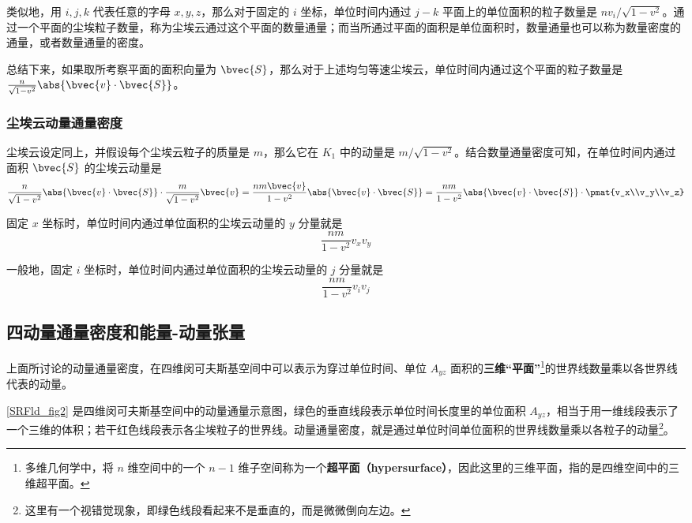 类似地，用 $i, j, k$ 代表任意的字母 $x, y, z$，那么对于固定的 $i$ 坐标，单位时间内通过 $j-k$ 平面上的单位面积的粒子数量是 $nv_i/\sqrt{1-v^2}$。通过一个平面的尘埃粒子数量，称为尘埃云通过这个平面的数量通量；而当所通过平面的面积是单位面积时，数量通量也可以称为数量密度的通量，或者数量通量的密度。

总结下来，如果取所考察平面的面积向量为 $\bvec{S}$，那么对于上述均匀等速尘埃云，单位时间内通过这个平面的粒子数量是 $\frac{n}{\sqrt{1-v^2}}\abs{\bvec{v}\cdot\bvec{S}}$。

\subsubsection{尘埃云动量通量密度}

尘埃云设定同上，并假设每个尘埃云粒子的质量是 $m$，那么它在 $K_1$ 中的动量是 $m/\sqrt{1-v^2}$。结合数量通量密度可知，在单位时间内通过面积 $\bvec{S}$ 的尘埃云动量是
\begin{equation}
\frac{n}{\sqrt{1-v^2}}\abs{\bvec{v}\cdot\bvec{S}}\cdot\frac{m}{\sqrt{1-v^2}}\bvec{v}=\frac{nm\bvec{v}}{1-v^2}\abs{\bvec{v}\cdot\bvec{S}}=\frac{nm}{1-v^2}\abs{\bvec{v}\cdot\bvec{S}}\cdot\pmat{v_x\\v_y\\v_z}
\end{equation}

固定 $x$ 坐标时，单位时间内通过单位面积的尘埃云动量的 $y$ 分量就是
\begin{equation}
\frac{nm}{1-v^2}v_xv_y
\end{equation}

一般地，固定 $i$ 坐标时，单位时间内通过单位面积的尘埃云动量的 $j$ 分量就是
\begin{equation}\label{SRFld_eq1}
\frac{nm}{1-v^2}v_iv_j
\end{equation}

\subsection{四动量通量密度和能量-动量张量}

上面所讨论的动量通量密度，在四维闵可夫斯基空间中可以表示为穿过单位时间、单位 $A_{yz}$ 面积的\textbf{三维“平面”}\footnote{多维几何学中，将 $n$ 维空间中的一个 $n-1$ 维子空间称为一个\textbf{超平面（hypersurface）}，因此这里的三维平面，指的是四维空间中的三维超平面。}的世界线数量乘以各世界线代表的动量。

\autoref{SRFld_fig2} 是四维闵可夫斯基空间中的动量通量示意图，绿色的垂直线段表示单位时间长度里的单位面积 $A_{yz}$，相当于用一维线段表示了一个三维的体积；若干红色线段表示各尘埃粒子的世界线。动量通量密度，就是通过单位时间单位面积的世界线数量乘以各粒子的动量\footnote{这里有一个视错觉现象，即绿色线段看起来不是垂直的，而是微微倒向左边。}。

